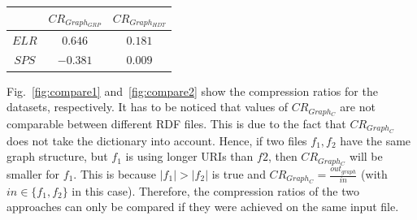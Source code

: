 
\begin{center}
	\begin{tabular}{|c|c|c|}
		\hline 
		& $CR_{Graph_{GRP}}$ & $CR_{Graph_{HDT}}$ \\ 
		\hline 
		$ELR$ & $ 0.646 $ & $ 0.181 $  \\ 
		\hline 
		$SPS$ & $ -0.381 $ & $ 0.009 $ \\ 
		\hline 
	\end{tabular} 
	\label{tab:spearman}
\end{center}

Fig.~\ref{fig:compare1} and~\ref{fig:compare2} show the compression ratios for the datasets, respectively. It has to be noticed that values of $CR_{Graph_C}$ are not comparable between different RDF files. This is due to the fact that $CR_{Graph_C}$ does not take the dictionary into account. Hence, if two files $f_1,f_2$ have the same graph structure, but $f_1$  is using longer URIs than $f2$, then $CR_{Graph_C}$ will be smaller for $f_1$. This is because $|f_1|>|f_2|$ is true and $CR_{Graph_C}=\frac{out_{graph}}{in}$ (with $in\in \{f_1,f_2\}$ in this case). Therefore, the compression ratios of the two approaches can only be compared if they were achieved on the same input file.




